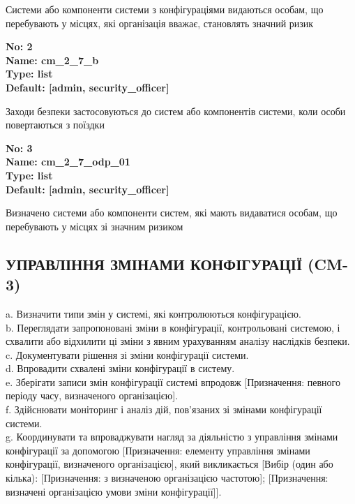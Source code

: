 \documentclass{article}
\begin{document}
{\footnotesize Системи або компоненти системи з конфігураціями видаються особам, що перебувають у місцях, які організація вважає, становлять значний ризик}


{\footnotesize\bfseries
No: 2\\
Name: cm\_\allowbreak{}2\_\allowbreak{}7\_\allowbreak{}b\\
Type: list\\
Default: [\textquotedbl{}admin\textquotedbl{}, \textquotedbl{}security\_\allowbreak{}officer\textquotedbl{}]
}

{\footnotesize Заходи безпеки застосовуються до систем або компонентів системи, коли особи повертаються з поїздки}


{\footnotesize\bfseries
No: 3\\
Name: cm\_\allowbreak{}2\_\allowbreak{}7\_\allowbreak{}odp\_\allowbreak{}01\\
Type: list\\
Default: [\textquotedbl{}admin\textquotedbl{}, \textquotedbl{}security\_\allowbreak{}officer\textquotedbl{}]
}

{\footnotesize Визначено системи або компоненти систем, які мають видаватися особам, що перебувають у місцях зі значним ризиком}




\subsection{УПРАВЛІННЯ ЗМІНАМИ КОНФІГУРАЦІЇ (CM-3)}
a. Визначити типи змін у системі, які контролюються конфігурацією.\\ 
b. Переглядати запропоновані зміни в конфігурації, контрольовані системою, і схвалити або відхилити ці зміни з явним урахуванням аналізу наслідків безпеки.\\ 
c. Документувати рішення зі зміни конфігурації системи.\\ 
d. Впровадити схвалені зміни конфігурації в систему.\\ 
e. Зберігати записи змін конфігурації системі впродовж [Призначення: певного періоду часу, визначеного організацією].\\ 
f. Здійснювати моніторинг і аналіз дій, пов'язаних зі змінами конфігурації системи.\\ 
g. Координувати та впроваджувати нагляд за діяльністю з управління змінами конфігурації за допомогою [Призначення: елементу управління змінами конфігурації, визначеного організацією], який викликається [Вибір (один або кілька): [Призначення: з визначеною організацією частотою]; [Призначення: визначені організацією умови зміни конфігурації]].
\end{document}
